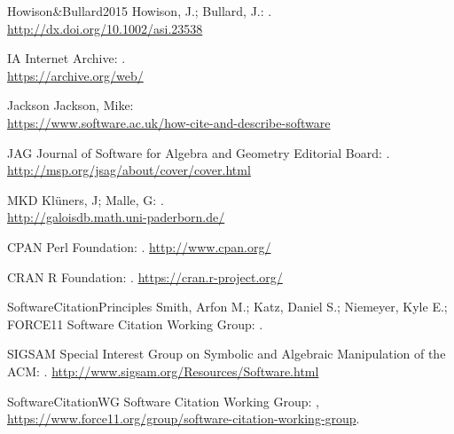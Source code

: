 \documentclass[a4paper,11pt]{article}
\begin{document}
\begin{multicols}{2}
\begin{thebibliography}{19}
\bibitem
{Howison&Bullard2015}
Howison, J.; Bullard, J.:
.
\\
\url{http://dx.doi.org/10.1002/asi.23538}

\bibitem
{IA}
Internet Archive:
.\\
\newblock \url{https://archive.org/web/}


\bibitem
{Jackson}
Jackson, Mike:
\\
\newblock \url{https://www.software.ac.uk/how-cite-and-describe-software}

\bibitem
{JAG}
Journal of Software for Algebra and Geometry Editorial Board:
.\\
\newblock \url{http://msp.org/jsag/about/cover/cover.html}

\bibitem
{MKD}
Kl\"uners, J; Malle, G:
.\\
\newblock \url{http://galoisdb.math.uni-paderborn.de/}

\bibitem
{CPAN}
Perl Foundation:
.
\newblock \url{http://www.cpan.org/}


\bibitem
{CRAN}
R Foundation:
.
\newblock \url{https://cran.r-project.org/}

\bibitem
{SoftwareCitationPrinciples}
Smith, Arfon M.; Katz, Daniel S.; Niemeyer, Kyle E.; FORCE11 Software Citation Working Group:
.\\

\bibitem
{SIGSAM}
Special Interest Group on Symbolic and Algebraic Manipulation of the ACM:
.
\newblock \url{http://www.sigsam.org/Resources/Software.html}


\bibitem
{SoftwareCitationWG}
Software Citation Working Group:
,
\newblock \url{https://www.force11.org/group/software-citation-working-group}.


\end{thebibliography}
\end{multicols}
\end{document}
